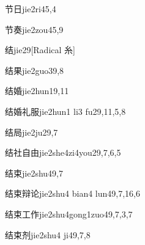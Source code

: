 \begin{entry}{节日}{jie2ri4}{5,4}
\end{entry}

\begin{entry}{节奏}{jie2zou4}{5,9}
\end{entry}

\begin{entry}{结}{jie2}{9}[Radical 糸]
\end{entry}

\begin{entry}{结果}{jie2guo3}{9,8}
\end{entry}

\begin{entry}{结婚}{jie2hun1}{9,11}
\end{entry}

\begin{entry}{结婚礼服}{jie2hun1 li3 fu2}{9,11,5,8}
\end{entry}

\begin{entry}{结局}{jie2ju2}{9,7}
\end{entry}

\begin{entry}{结社自由}{jie2she4zi4you2}{9,7,6,5}
\end{entry}

\begin{entry}{结束}{jie2shu4}{9,7}
\end{entry}

\begin{entry}{结束辩论}{jie2shu4 bian4 lun4}{9,7,16,6}
\end{entry}

\begin{entry}{结束工作}{jie2shu4gong1zuo4}{9,7,3,7}
\end{entry}

\begin{entry}{结束剂}{jie2shu4 ji4}{9,7,8}
\end{entry}

